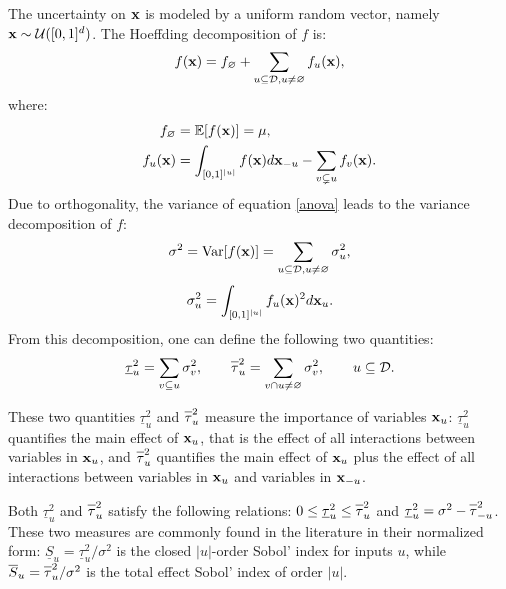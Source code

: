 The uncertainty on $\boldsymbol{\mathbf{x}}$ is modeled by a uniform random vector, namely $\boldsymbol{\mathbf{x}} \sim \mathcal{U}([0,1]^d)$. The Hoeffding decomposition \cite{Hoeffding,Sobol'} of $f$ is:
\begin{equation}
f(\boldsymbol{\mathbf{x}})=f_{\varnothing}+\sum \limits_{u \subseteq \mathcal{D}, u \neq \varnothing} f_u(\boldsymbol{\mathbf{x}}),
\label{anova}
\end{equation}
where:
\begin{align*}
f_{\varnothing} &= \mathbb{E}[f(\boldsymbol{\mathbf{x}})]= \mu, \\
f_u(\boldsymbol{\mathbf{x}}) &= \int_{[0,1]^{|u|}} f(\boldsymbol{\mathbf{x}}) d{\boldsymbol{\mathbf{x}}}_{-u} - \sum \limits_{v \subsetneq u} f_v(\boldsymbol{\mathbf{x}}).
\end{align*}
Due to orthogonality, the variance of equation \eqref{anova} leads to the variance decomposition of $f$:
\[ \sigma^2 = \mathrm{Var}[f(\boldsymbol{\mathbf{x}})] = \sum \limits_{u \subseteq \mathcal{D}, u \neq \varnothing} \sigma_u^2,\]
\[ \sigma_u^2=\int_{[0,1]^{|u|}} f_u(\boldsymbol{\mathbf{x}})^2 d{\boldsymbol{\mathbf{x}}_u}.\]
From this decomposition, one can define the following two quantities:
\[\underline{\tau}_u^2 = \sum \limits_{v \subseteq u} \sigma_v^2, \qquad
\ov{$\tau$}_u^2 = \sum \limits_{v \cap u \neq \varnothing} \sigma_v^2, \qquad u \subseteq \mathcal{D}.\]

These two quantities $\underline{\tau}_u^2$ and $\ov{$\tau$}_u^2$ measure the importance of variables $\boldsymbol{\mathbf{x}}_u$: $\underline{\tau}_u^2$ quantifies the main effect of $\boldsymbol{\mathbf{x}}_u$, that is the effect of all interactions between variables in $\boldsymbol{\mathbf{x}}_u$, and $\ov{$\tau$}_u^2$ quantifies the main effect of $\boldsymbol{\mathbf{x}}_u$ plus the effect of all interactions between variables in $\boldsymbol{\mathbf{x}}_u$ and variables in $\boldsymbol{\mathbf{x}}_{-u}$.

Both $\underline{\tau}_u^2$ and $\ov{$\tau$}_u^2$ satisfy the following relations: $ 0 \leq  \underline{\tau}_u^2 \leq \ov{$\tau$}_u^2$ and $\underline{\tau}_u^2 = \sigma^2 - \ov{$\tau$}_{-u}^2$. These two measures are commonly found in the literature in their normalized form: $\underline{S}_u = \underline{\tau}_u^2 / \sigma^2$ is the closed $|u|$-order Sobol' index for inputs $u$, while $\ov{$S$}_u = \ov{$\tau$}_u^2 / \sigma^2$ is the total effect Sobol' index of order $|u|$.
\bigskip


